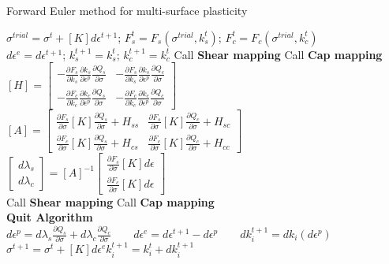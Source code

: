 \documentclass[12pt]{article}
\begin{document}
\begin{algorithm}[H]
\renewcommand{\thealgocf}{Main}
\caption{Forward Euler method for multi-surface plasticity}


$\sigma^{trial}=\sigma^t+[K]d\epsilon^{t+1}$;
$F_s^t=F_s(\sigma^{trial}, k_s^t)$;
$F_c^t=F_c(\sigma^{trial}, k_c^t)$\\
{$d\epsilon^e=d\epsilon^{t+1}$; $k_s^{t+1}=k_s^t$; $k_c^{t+1}=k_c^t$}
{Call \textbf{Shear mapping}}
{Call \textbf{Cap mapping}}
{{$[H] =
\begin{bmatrix}
-\frac{\partial F_s}{\partial k_s} \frac{\partial k_s}{\partial \epsilon^p} \frac{\partial Q_s}{\partial \sigma} & -\frac{\partial F_s}{\partial k_s} \frac{\partial k_s}{\partial \epsilon^p} \frac{\partial Q_c}{\partial \sigma}\\
-\frac{\partial F_c}{\partial k_c} \frac{\partial k_c}{\partial \epsilon^p} \frac{\partial Q_s}{\partial \sigma} & -\frac{\partial F_c}{\partial k_c} \frac{\partial k_c}{\partial \epsilon^p} \frac{\partial Q_c}{\partial \sigma}
\end{bmatrix}$\\
$[A] =
\begin{bmatrix}
\frac{\partial F_s}{\partial \sigma} [K] \frac{\partial Q_s}{\partial \sigma} + H_{ss} & \frac{\partial F_s}{\partial \sigma} [K] \frac{\partial Q_c}{\partial \sigma} + H_{sc}\\
\frac{\partial F_c}{\partial \sigma} [K] \frac{\partial Q_s}{\partial \sigma} + H_{cs} & \frac{\partial F_c}{\partial \sigma} [K] \frac{\partial Q_c}{\partial \sigma} + H_{cc}
\end{bmatrix}$\\
$
\begin{bmatrix}
d \lambda_s\\
d \lambda_c
\end{bmatrix} =
[A]^{-1}
\begin{bmatrix}
\frac{\partial F_s}{\partial \sigma} [K] d\epsilon\\
\frac{\partial F_c}{\partial \sigma} [K] d\epsilon
\end{bmatrix}$\\}
{Call \textbf{Shear mapping}}
{Call \textbf{Cap mapping}}
{\\
\textbf{Quit Algorithm}}
\Else
{$d\epsilon^p = d\lambda_s \frac{\partial Q_s}{\partial \sigma} + d\lambda_c \frac{\partial Q_c}{\partial \sigma} \qquad
d\epsilon^e=d\epsilon^{t+1}-d\epsilon^p \qquad
d k_i^{t+1}=d k_i(d\epsilon^p)$}}
$\sigma^{t+1}=\sigma^t+[K]d\epsilon^e$\qquad$k_i^{t+1}=k_i^t+dk_i^{t+1}$
\end{algorithm}
\end{document}

